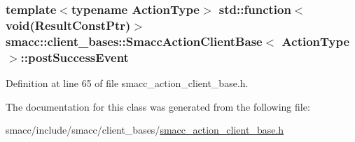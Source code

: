 \subsubsection[{\texorpdfstring{post\+Success\+Event}{postSuccessEvent}}]{\setlength{\rightskip}{0pt plus 5cm}template$<$typename Action\+Type$>$ std\+::function$<$void(Result\+Const\+Ptr)$>$ {\bf smacc\+::client\+\_\+bases\+::\+Smacc\+Action\+Client\+Base}$<$ Action\+Type $>$\+::post\+Success\+Event}\hypertarget{classsmacc_1_1client__bases_1_1SmaccActionClientBase_afb4f82508cd653d496392f321e84a783}{}\label{classsmacc_1_1client__bases_1_1SmaccActionClientBase_afb4f82508cd653d496392f321e84a783}


Definition at line 65 of file smacc\+\_\+action\+\_\+client\+\_\+base.\+h.



The documentation for this class was generated from the following file\+:\begin{DoxyCompactItemize}
\item 
smacc/include/smacc/client\+\_\+bases/\hyperlink{smacc__action__client__base_8h}{smacc\+\_\+action\+\_\+client\+\_\+base.\+h}\end{DoxyCompactItemize}

